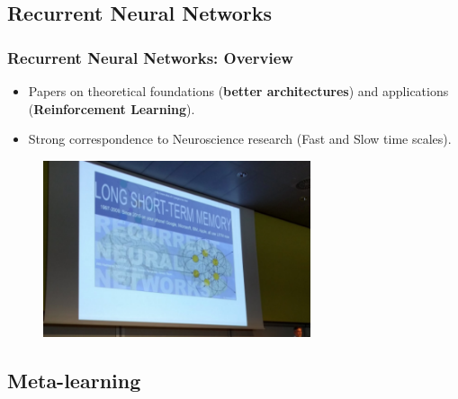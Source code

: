 \documentclass[11pt,
               hyperref={colorlinks,citecolor=pink,linkcolor=red,urlcolor=blue}
               ]{beamer}
\begin{document}
  \subsection{Recurrent Neural Networks}

  \begin{frame}
    \frametitle{Recurrent Neural Networks: Overview}

    \begin{itemize}
      \item Papers on theoretical foundations (\textbf{better architectures}\footnotemark[1]) and applications (\textbf{Reinforcement Learning}\footnotemark[2]).
      \item Strong correspondence to Neuroscience research (Fast and Slow time scales\footnotemark[3]).
    \end{itemize}

    \begin{figure}
      \centering
      \includegraphics[width=0.7\textwidth,height=0.45\textheight]{rnn2.png}
    \end{figure}

  \end{frame}

  \subsection{Meta-learning}
\end{document}

